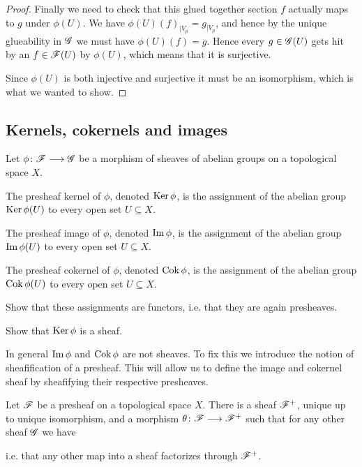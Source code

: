 \begin{proof}
Finally we need to check that this glued together section $f$ actually maps to $g$ under $\phi(U)$. We have $\phi(U)(f)_{\vert V_p} = g_{\vert V_p}$, and hence by the unique glueability in $\mathscr{G}$ we must have $\phi(U)(f)=g$. Hence every $g\in \mathscr{G}(U)$ gets hit by an $f\in \mathscr{F}(U)$ by $\phi(U)$, which means that it is surjective. 

Since $\phi(U)$ is both injective and surjective it must be an isomorphism, which is what we wanted to show. 
\end{proof}



\subsection{Kernels, cokernels and images}

Let $\phi\colon\mathscr{F}\longrightarrow\mathscr{G}$ be a morphism of sheaves of abelian groups on a topological space $X$. 

\begin{definition}
The presheaf kernel of $\phi$, denoted $\operatorname{Ker}\phi$, is the assignment of the abelian group $\operatorname{Ker} \phi(U)$ to every open set $U\subseteq X$. 
\end{definition}

\begin{definition}
The presheaf image of $\phi$, denoted $\operatorname{Im}\phi$, is the assignment of the abelian group $\operatorname{Im} \phi(U)$ to every open set $U\subseteq X$. 
\end{definition}

\begin{definition}
The presheaf cokernel of $\phi$, denoted $\operatorname{Cok}\phi$, is the assignment of the abelian group $\operatorname{Cok} \phi(U)$ to every open set $U\subseteq X$. 
\end{definition}
    
\begin{problem}
Show that these assignments are functors, i.e. that they are again presheaves. 
\end{problem}
\begin{problem}
Show that $\operatorname{Ker}\phi$ is a sheaf. 
\end{problem}

In general $\operatorname{Im}\phi$ and $\operatorname{Cok}\phi$ are not sheaves. To fix this we introduce the notion of sheafification of a presheaf. This will allow us to define the image and cokernel sheaf by sheafifying their respective presheaves. 

\begin{proposition}
Let $\mathscr{F}$ be a presheaf on a topological space $X$. There is a sheaf $\mathscr{F}^+$, unique up to unique isomorphism, and a morphism $\theta\colon\mathscr{F}\longrightarrow \mathscr{F}^+$ such that for any other sheaf $\mathscr{G}$ we have
\begin{center}
\end{center}
i.e. that any other map into a sheaf factorizes through $\mathscr{F}^+$.
\end{proposition}


